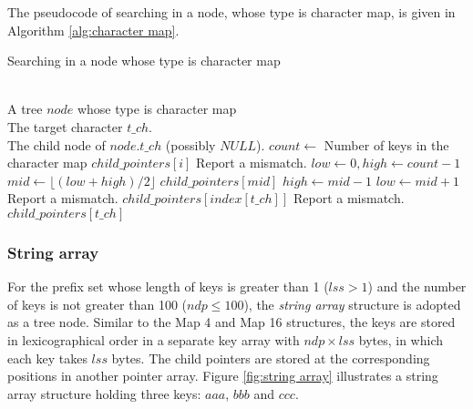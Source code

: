 The pseudocode of searching in a node, whose type is character map, is
given in Algorithm \ref{alg:character map}.

\begin{algorithm}
  \caption{Searching in a node whose type is character map}\scriptsize
  \label{alg:character map}
  \begin{algorithmic}[1]
    \REQUIRE ~~\\
    A tree $node$ whose type is character map\\
    The target character $t\_ch$.
    \ENSURE ~~\\
    The child node of $node.t\_ch$ (possibly $NULL$).
    \STATE
    \STATE $count \leftarrow$ Number of keys in the character map
    \STATE
    \RETURN $child\_pointers[i]$
    \ENDIF
    \ENDFOR
    \STATE Report a mismatch.
    \ENDCASE
    \STATE
    \STATE $low \leftarrow 0, high \leftarrow count-1$
    \STATE $mid \leftarrow \lfloor (low+high)/2 \rfloor$
    \RETURN $child\_pointers[mid]$
    \STATE $high \leftarrow mid-1$
    \ELSE
    \STATE $low \leftarrow mid+1$
    \ENDIF
    \ENDWHILE
    \STATE Report a mismatch.
    \ENDCASE
    \STATE
    \RETURN $child\_pointers[index[t\_ch]]$
    \ELSE
    \STATE Report a mismatch.
    \ENDIF
    \ENDCASE
    \STATE
    \RETURN $child\_pointers[t\_ch]$
    \ENDCASE
    \ENDPWITCH
  \end{algorithmic}
\end{algorithm}

\subsubsection{String array}
\label{sec:string array}

For the prefix set whose length of keys is greater than 1 ($lss > 1$)
and the number of keys is not greater than 100 ($ndp \leq 100$), the
\emph{string array} structure is adopted as a tree node. Similar to
the Map 4 and Map 16 structures, the keys are stored in
lexicographical order in a separate key array with $ndp \times lss$
bytes, in which each key takes $lss$ bytes. The child pointers are
stored at the corresponding positions in another pointer array. Figure
\ref{fig:string array} illustrates a string array structure holding
three keys: $aaa$, $bbb$ and $ccc$.

